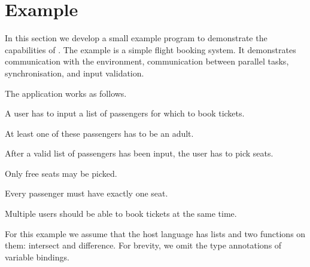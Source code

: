 
\section{Example}


In this section we develop a small example program to demonstrate the capabilities of \TOPHAT.
The example is a simple flight booking system.
It demonstrates communication with the environment, communication between parallel tasks, synchronisation, and input validation.

The application works as follows.
\begin{enumerate*}
  \item A user has to input a list of passengers for which to book tickets.
  \item At least one of these passengers has to be an adult.
  \item After a valid list of passengers has been input, the user has to pick seats.
  \item Only free seats may be picked.
  \item Every passenger must have exactly one seat.
  \item Multiple users should be able to book tickets at the same time.
\end{enumerate*}
For this example we assume that the host language has lists and two functions on them: intersect and difference.
For brevity, we omit the type annotations of variable bindings.



